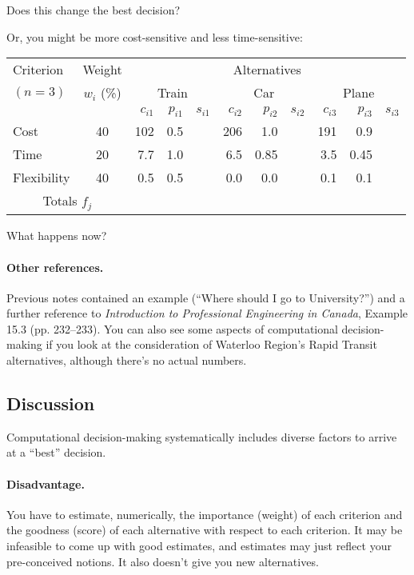 {\sf Does this change the best decision?}
\vspace{2em}

Or, you might be more cost-sensitive and less time-sensitive:
{\Large
\begin{center}
\begin{tabular}{l|c|rrr|rrr|rrr}
Criterion & Weight & \multicolumn{9}{c}{Alternatives} \\
$(n=3)$ & $w_i$ (\%) & \multicolumn{3}{c|}{Train} & \multicolumn{3}{c|}{Car} & \multicolumn{3}{c}{Plane} \\
&& $c_{i1}$ & $p_{i1}$& $s_{i1}$ & $c_{i2}$ & $p_{i2}$ & $s_{i2}$ & $c_{i3}$ & $p_{i3}$ & $s_{i3}$ \\  \hline
Cost & 40 & 102 & 0.5 & & 206 & 1.0 & & 191 & 0.9 &  \\
Time & 20 & 7.7 & 1.0 & & 6.5 & 0.85 & & 3.5 & 0.45 \\
Flexibility & 40 & 0.5&0.5 &&0.0 &0.0 &&0.1 &0.1& \\ \hline
\multicolumn{2}{c|}{Totals $f_j$} & 
\end{tabular}
\end{center}
}

{\sf What happens now?}
\vspace{2em}

\paragraph{Other references.}
Previous notes contained an example (``Where should I go to
University?'') and a further reference to \emph{Introduction to
  Professional Engineering in Canada}, Example 15.3
(pp. 232--233). You can also see some aspects of computational
decision-making if you look at the consideration of Waterloo Region's
Rapid Transit alternatives, although there's no actual numbers.  

\subsection*{Discussion}
Computational decision-making systematically includes diverse factors
to arrive at a ``best'' decision.

\paragraph{Disadvantage.} You have to estimate, numerically, the 
importance (weight) of each criterion and the goodness (score) of each 
alternative with respect to each criterion. It may be infeasible to
come up with good estimates, and estimates may just reflect your
pre-conceived notions. It also doesn't give you new alternatives.

